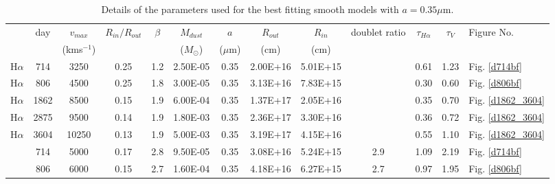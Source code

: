 \documentclass[useAMS,usenatbib,usegraphicx]{mnras}
\begin{document}
\begin{table}
	\begin{minipage}{180mm}
	\caption{Details of the parameters used for the best fitting smooth models with $a=0.35\mu$m.}
	\label{smooth1}
	\begin{center}
  	\begin{tabular}{@{} ccccccccccccl @{}}
    	\hline
 & day & $v_{max}$ & $R_{in}/R_{out}$ & $\beta$ & $M_{dust}$ & $a$ & $R_{out}$ & $R_{in}$ & doublet ratio & $\tau_{H\alpha}$ & $\tau_V$  & Figure No. \\
	&& (kms$^{-1} $) & & & ($M_{\odot}$) & ($\mu$m) & (cm) & (cm)  \\
	\hline
H$\alpha$ & 714 & 3250 & 0.25 & 1.2 & 2.50E-05 & 0.35 & 2.00E+16 & 5.01E+15 & & 0.61 & 1.23 &  Fig. \ref{d714bf}\\
H$\alpha$ & 806 & 4500 & 0.25 & 1.8 & 3.00E-05 & 0.35 & 3.13E+16 & 7.83E+15 & & 0.30 & 0.60 &  Fig. \ref{d806bf}\\
H$\alpha$ & 1862 & 8500 & 0.15 & 1.9 & 6.00E-04 & 0.35 & 1.37E+17 & 2.05E+16 & & 0.35 & 0.70 &  Fig. \ref{d1862_3604}\\
H$\alpha$ & 2875 & 9500 & 0.14 & 1.9 & 1.80E-03 & 0.35 & 2.36E+17 & 3.30E+16 & & 0.36 & 0.72 &  Fig. \ref{d1862_3604}\\
H$\alpha$ & 3604 & 10250 & 0.13 & 1.9 & 5.00E-03 & 0.35 & 3.19E+17 & 4.15E+16 & & 0.55 & 1.10 &  Fig. \ref{d1862_3604}\\ \relax
[OI] & 714 & 5000 & 0.17 & 2.8 & 9.50E-05 & 0.35 & 3.08E+16 & 5.24E+15 & 2.9 & 1.09 & 2.19 & Fig. \ref{d714bf}\\ \relax
[OI] & 806 & 6000 & 0.15 & 2.7 & 1.60E-04 & 0.35 & 4.18E+16 & 6.27E+15 & 2.7 & 0.97 & 1.95 & Fig. \ref{d806bf} \\
    \hline
  \end{tabular}
  \end{center}
\end{minipage}
\end{table}
\end{document}
